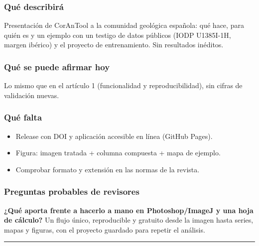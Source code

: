 \documentclass[
  10pt,
]{article}
\providecommand{\tightlist}{%
  \setlength{\itemsep}{0pt}\setlength{\parskip}{0pt}}
\begin{document}
\hypertarget{quuxe9-describiruxe1-3}{%
\subsubsection{Qué describirá}\label{quuxe9-describiruxe1-3}}

Presentación de CorAnTool a la comunidad geológica española: qué hace,
para quién es y un ejemplo con un testigo de datos públicos (IODP
U1385I-1H, margen ibérico) y el proyecto de entrenamiento. Sin
resultados inéditos.

\hypertarget{quuxe9-se-puede-afirmar-hoy-3}{%
\subsubsection{Qué se puede afirmar
hoy}\label{quuxe9-se-puede-afirmar-hoy-3}}

Lo mismo que en el artículo 1 (funcionalidad y reproducibilidad), sin
cifras de validación nuevas.

\hypertarget{quuxe9-falta}{%
\subsubsection{Qué falta}\label{quuxe9-falta}}

\begin{itemize}
\tightlist
\item[$\square$]
  Release con DOI y aplicación accesible en línea (GitHub Pages).
\item[$\square$]
  Figura: imagen tratada + columna compuesta + mapa de ejemplo.
\item[$\square$]
  Comprobar formato y extensión en las normas de la revista.
\end{itemize}

\hypertarget{preguntas-probables-de-revisores-3}{%
\subsubsection{Preguntas probables de
revisores}\label{preguntas-probables-de-revisores-3}}

\textbf{¿Qué aporta frente a hacerlo a mano en Photoshop/ImageJ y una
hoja de cálculo?} Un flujo único, reproducible y gratuito desde la
imagen hasta series, mapas y figuras, con el proyecto guardado para
repetir el análisis.

\begin{center}\rule{0.5\linewidth}{0.5pt}\end{center}
\end{document}
